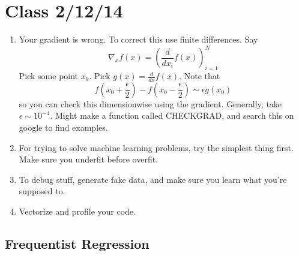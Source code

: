 \documentclass{amsart}
\begin{document}
\section{Class 2/12/14}

\begin{enumerate}
\item Your gradient is wrong. To correct this use finite differences. Say
$$\nabla_x f(x) = (\frac{d}{dx_i}f(x))_{i=1}^N$$
Pick some point $x_0$. Pick $g(x)=\frac d {dx}f(x)$. Note that 
$$f(x_0 + \frac \epsilon 2)-f(x_0 - \frac \epsilon 2) \sim \epsilon g(x_0)$$ so you can check this dimensionwise using the gradient. Generally, take $\epsilon \sim 10^{-4}.$ Might make a function called CHECKGRAD, and search this on google to find examples.
\item For trying to solve machine learning problems, try the simplest thing first. Make sure you underfit before overfit.
\item To debug stuff, generate fake data, and make sure you learn what you're supposed to. 
\item Vectorize and profile your code.
\end{enumerate}

\subsection{Frequentist Regression}
\end{document}

